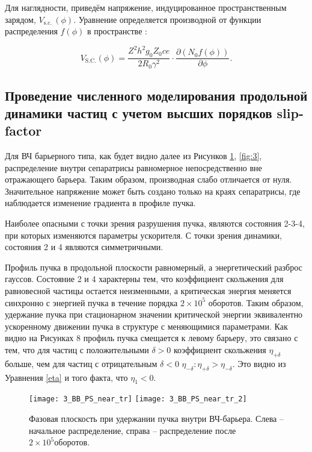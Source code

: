 Для наглядности, приведём напряжение, индуцированное про\-стран\-стве\-нным зарядом, $V_{\mathrm{s.c.\ }}(\phi)$. Уравнение определяется производной от функции распределения $f(\phi)$ в пространстве \cite{sc}:

\begin{equation}
V_{\text{S.C.}}\left(\phi\right)=\frac{Z^2h^2g_0Z_0ce}{2R_0\gamma^2}\cdot\frac{\partial\left(N_0f\left(\phi\right)\right)}{\partial\phi}.
\label{V_sc}
\end{equation}

	\subsection{Проведение численного моделирования продольной динамики частиц с учетом высших порядков slip- factor}\label{subsec:transition_jump/regular/slip_factor}

\par Для ВЧ барьерного типа, как будет видно далее из Рисунков \ref{fig:2}, \ref{fig:3}, распределение внутри сепаратрисы равномерное непосредственно вне от\-ра\-жа\-ющего барьера. Таким образом, производная слабо отличается от нуля. Значительное напряжение может быть создано только на кра\-ях сепаратрисы, где наблюдается изменение градиента в профиле пучка.

\par Наиболее опасными с точки зрения разрушения пучка, являются со\-сто\-я\-ния 2-3-4, при которых изменяются параметры ускорителя. С точки зрения динамики, состояния 2 и 4 являются симметричными.
\par Профиль пучка в продольной плоскости равномерный, а э\-нер\-ге\-ти\-чес\-кий разброс гауссов. Состояние 2 и 4 характерны тем, что коэффициент скольжения для равновесной частицы остается неизменными, а кри\-ти\-чес\-кая энергия меняется синхронно с энергией пучка в течение порядка $2\times{10}^5$ оборотов. Таким образом, удержание пучка при стационарном значении критической энергии эквивалентно ускоренному движении пуч\-ка в структуре с меняющимися параметрами. Как видно на Рисунках 8 профиль пучка смещается к левому барьеру, это связано с тем, что для частиц с положительными $\delta>0$ коэффициент скольжения $\eta_{+\delta}$ больше, чем для частиц с отрицательным $\delta<0$ $\eta_{-\delta}: \eta_{+\delta}>\eta_{-\delta}$. Это видно из Уравнения \ref{eta} и того факта, что $\eta_1<0$. 

\begin{figure}
   \texttt{[image: 3\_BB\_PS\_near\_tr]}
   \texttt{[image: 3\_BB\_PS\_near\_tr\_2]}
   \caption{Фазовая плоскость при удержании пучка внутри ВЧ-барьера. Слева – начальное распределение, справа – распределение после $2\times{10}^5 оборотов$.}
   \label{fig:2}
\end{figure}

